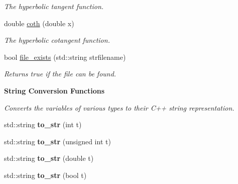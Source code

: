 \begin{DoxyCompactItemize}
\begin{DoxyCompactList}\small\item\em The hyperbolic tangent function. \end{DoxyCompactList}\item 
\hypertarget{namespacepyne_a03cad3093b97f2f6a5dcb5cdc4cb562e}{double \hyperlink{namespacepyne_a03cad3093b97f2f6a5dcb5cdc4cb562e}{coth} (double x)}\label{namespacepyne_a03cad3093b97f2f6a5dcb5cdc4cb562e}

\begin{DoxyCompactList}\small\item\em The hyperbolic cotangent function. \end{DoxyCompactList}\item 
\hypertarget{namespacepyne_ad514c252885b18fb9c6ef3ac5f0ac680}{bool \hyperlink{namespacepyne_ad514c252885b18fb9c6ef3ac5f0ac680}{file\-\_\-exists} (std\-::string strfilename)}\label{namespacepyne_ad514c252885b18fb9c6ef3ac5f0ac680}

\begin{DoxyCompactList}\small\item\em Returns true if the file can be found. \end{DoxyCompactList}\end{DoxyCompactItemize}
\begin{Indent}{\bf String Conversion Functions}\par
{\em Converts the variables of various types to their C++ string representation. }\begin{DoxyCompactItemize}
\item 
\hypertarget{namespacepyne_a06170a309dd11535e158b0beed373b15}{std\-::string {\bfseries to\-\_\-str} (int t)}\label{namespacepyne_a06170a309dd11535e158b0beed373b15}

\item 
\hypertarget{namespacepyne_a44e69084a0b84a3c9b811daebdaa2a61}{std\-::string {\bfseries to\-\_\-str} (unsigned int t)}\label{namespacepyne_a44e69084a0b84a3c9b811daebdaa2a61}

\item 
\hypertarget{namespacepyne_a5011c13958373a872f4de2acfbc2e128}{std\-::string {\bfseries to\-\_\-str} (double t)}\label{namespacepyne_a5011c13958373a872f4de2acfbc2e128}

\item 
\hypertarget{namespacepyne_afbfb8eabf2452faf4e2a5176fec6ebe8}{std\-::string {\bfseries to\-\_\-str} (bool t)}\label{namespacepyne_afbfb8eabf2452faf4e2a5176fec6ebe8}

\end{DoxyCompactItemize}
\end{Indent}
